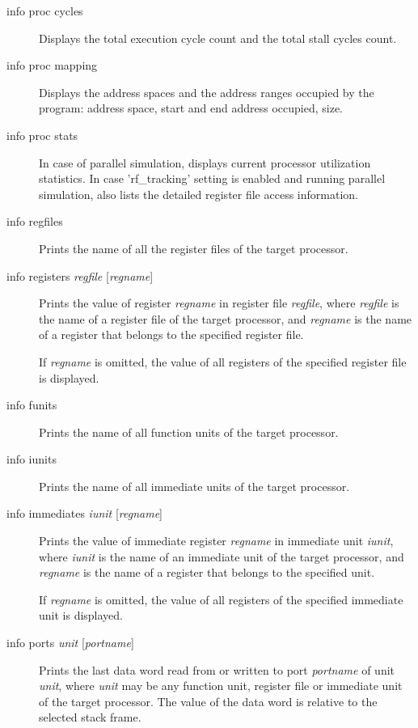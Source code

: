 \documentclass[twoside]{tceusermanual}
\begin{document}
\begin{description}
\item[info proc cycles] %
  Displays the total execution cycle count and the total stall cycles count.

\item[info proc mapping] %
  Displays the address spaces and the address ranges occupied by the
  program: address space, start and end address occupied, size.

\item[info proc stats] %
  In case of parallel simulation, displays current processor utilization
  statistics. In case 'rf\_tracking' setting is enabled and running parallel
  simulation, also lists the detailed register file access information. 

\item[info regfiles] %
  Prints the name of all the register files of the target processor.

\item[info registers \emph{regfile} {[\emph{regname}]}] %
  Prints the value of register \emph{regname} in register file
  \emph{regfile}, where \emph{regfile}
  is the name of a register file of the target processor, and \emph{regname}
  is the name of a register that belongs to the specified register file.

  If \emph{regname} is omitted, the value of all registers of the specified
  register file is displayed.

\item[info funits] %
  Prints the name of all function units of the target processor.

\item[info iunits] %
  Prints the name of all immediate units of the target processor.

\item[info immediates \emph{iunit} {[\emph{regname}]}] %
  Prints the value of immediate register \emph{regname} in immediate unit
  \emph{iunit}, where \emph{iunit} is the name of an immediate unit of 
  the target processor, and \emph{regname} is the name of a register 
  that belongs to the specified unit.

  If \emph{regname} is omitted, the value of all registers of the specified
  immediate unit is displayed.

\item[info ports \emph{unit} {[\emph{portname}]}] %
  Prints the last data word read from or written to port \emph{portname} of
  unit \emph{unit}, where \emph{unit} may be any function unit, register
  file or immediate unit of the target processor.  The value of the data
  word is relative to the selected stack frame.


\end{description}
\end{document}
